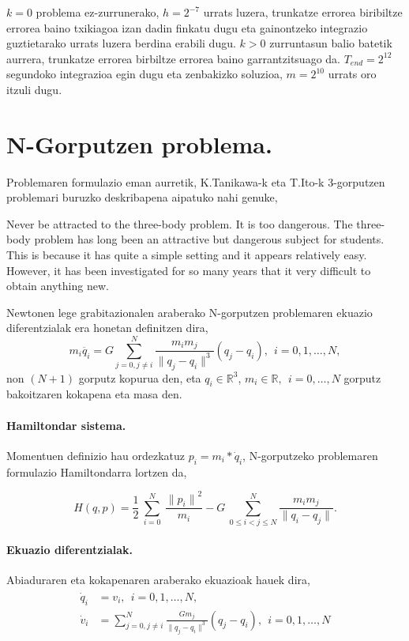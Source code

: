 $k=0$ problema ez-zurrunerako, $h=2^{-7}$ urrats luzera, trunkatze errorea biribiltze errorea baino txikiagoa izan dadin finkatu dugu eta gainontzeko integrazio guztietarako urrats luzera berdina erabili dugu. $k>0$ zurruntasun balio batetik aurrera, trunkatze errorea birbiltze errorea baino garrantzitsuago da. $T_{end}=2^{12}$  segundoko integrazioa egin dugu eta zenbakizko soluzioa, $m=2^{10}$ urrats oro itzuli dugu.   

\section{N-Gorputzen problema.}
\label{s:33}

Problemaren formulazio eman aurretik, K.Tanikawa-k eta T.Ito-k \cite{Ito2007} 3-gorputzen problemari buruzko deskribapena aipatuko nahi genuke,

\begin{displayquote}
Never be attracted to the three-body problem. It is too dangerous. The three-body problem has long been an attractive but dangerous subject for students. This is because it has quite a simple setting and it appears relatively easy. However, it has been investigated for so many years that it very difficult to obtain anything new.
\end{displayquote}

Newtonen lege grabitazionalen araberako N-gorputzen problemaren ekuazio diferentzialak era honetan definitzen dira,
\begin{equation}
m_i\ddot{q_i}= G \sum_{j=0,j \neq i}^{N} \frac{m_im_j}{\|q_j-q_i\|^3} (q_j-q_i) , \ \  i=0,1,\dots, N,
\end{equation}
non $(N+1)$ gorputz kopurua den, eta $q_i\in \mathbb{R}^3$, $m_i \in \mathbb{R}, \ \ i=0,\dots,N$ gorputz bakoitzaren kokapena eta masa den. 

\paragraph*{Hamiltondar sistema.}
Momentuen definizio hau ordezkatuz  $p_i=m_i*\dot{q}_i$, N-gorputzeko problemaren formulazio Hamiltondarra  lortzen da,  

\begin{equation}
H(q,p)=\frac{1}{2}\ \sum^N_{i=0}{\ \frac{{\|p_i\|}^2}{m_i}}-G\ \sum^N_{0\le i<j\le N}{\frac{m_im_j}{\|q_i-q_j\|}}. 
\end{equation}

\paragraph*{Ekuazio diferentzialak.} Abiaduraren eta kokapenaren araberako ekuazioak hauek dira,
\begin{align}
\begin{split}
\dot{q}_i &=v_i, \ \  i=0,1,\dots, N,\\
\dot{v}_i &= \sum_{j=0,j \neq i}^{N} \frac{Gm_j}{\|q_j-q_i\|^3} (q_j-q_i) , \ \  i=0,1,\dots, N
\end{split}
\end{align}


